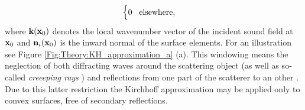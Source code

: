 \begin{itemize}
\begin{equation}
\begin{cases}
                        0  \hspace{3mm} \text{elsewhere},
                    \end{cases}
\label{eq:theory:windowing_function}
\end{equation}
where $\mathbf{k}(\mathbf{x}_0)$ denotes the local wavenumber vector of the incident sound field at $\mathbf{x}_0$ and $ \mathbf{n}_i(\mathbf{x}_0)$ is the inward normal of the surface elements. For an illustration see Figure \ref{Fig:Theory:KH_approximation_a} (a).
%
This windowing means the neglection of both diffracting waves around the scattering object (as well as so-called \emph{creeeping rays} \cite{Bleistein1984}) and reflections from one part of the scatterer to an other \cite{Pignier2015}. 
Due to this latter restriction the Kirchhoff approximation may be applied only to convex surfaces, free of secondary reflections.
%
\end{itemize}

